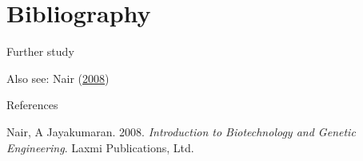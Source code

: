 \documentclass[ignorenonframetext,aspectratio=169]{beamer}
\begin{document}
\hypertarget{bibliography}{%
\section{Bibliography}\label{bibliography}}

\begin{frame}{Further study}
\protect\hypertarget{further-study}{}

Also see: Nair (\protect\hyperlink{ref-nair2008introduction}{2008})

\end{frame}

\begin{frame}{References}
\protect\hypertarget{references}{}

\hypertarget{refs}{}
\leavevmode\hypertarget{ref-nair2008introduction}{}%
Nair, A Jayakumaran. 2008. \emph{Introduction to Biotechnology and
Genetic Engineering}. Laxmi Publications, Ltd.

\end{frame}
\end{document}
